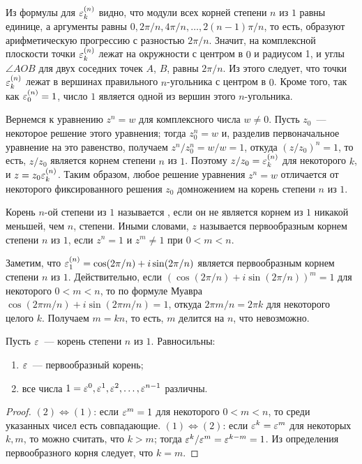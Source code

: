 \begin{remark}\label{rem:roots_of_unity_geometry}
Из формулы для $\varepsilon_k^{(n)}$ видно, что модули всех корней степени
$n$ из $1$ равны единице, а аргументы равны
$0,2\pi/n,4\pi/n,\dots,2(n-1)\pi/n$, то есть, образуют арифметическую
прогрессию с разностью $2\pi/n$. Значит, на комплексной плоскости
точки $\varepsilon_k^{(n)}$ лежат на окружности с центром в $0$ и радиусом 1,
и углы $\angle AOB$ для двух соседних точек $A$, $B$, равны
$2\pi/n$. Из этого следует, что точки $\varepsilon_k^{(n)}$ лежат в вершинах
правильного $n$-угольника с центром в $0$. Кроме того, так как
$\varepsilon_0^{(n)}=1$, число $1$ является одной из вершин этого $n$-угольника.
\end{remark}

\begin{remark}
Вернемся к уравнению $z^n=w$ для комплексного числа $w\neq 0$. Пусть
$z_0$~--- некоторое решение этого уравнения; тогда $z_0^n=w$ и,
разделив первоначальное уравнение на это равенство, получаем
$z^n/z_0^n=w/w=1$, откуда $(z/z_0)^n=1$, то есть, $z/z_0$ является
корнем степени $n$ из $1$. Поэтому $z/z_0=\varepsilon_k^{(n)}$ для некоторого
$k$, и $z=z_0\varepsilon_k^{(n)}$. Таким образом, любое решение уравнения
$z^n=w$ отличается от некоторого фиксированного решения $z_0$
домножением на корень степени $n$ из $1$.
\end{remark}

\begin{definition}
Корень $n$-ой степени из $1$ называется
, если он
не является корнем из $1$ никакой меньшей, чем $n$, степени. Иными
словами, $z$ называется первообразным корнем степени $n$ из $1$, если
$z^n=1$ и $z^m\neq 1$ при $0<m<n$.
\end{definition}

\begin{remark}
Заметим, что $\varepsilon_1^{(n)}=\cos(2\pi/n)+i\sin(2\pi/n)$ является
первообразным корнем степени $n$ из $1$. Действительно, если
$(\cos(2\pi/n)+i\sin(2\pi/n))^m=1$ для некоторого $0<m<n$, то
по формуле Муавра $\cos(2\pi m/n)+i\sin(2\pi m/n)=1$, откуда $2\pi
m/n=2\pi k$ для некоторого целого $k$. Получаем $m=kn$, то есть, $m$
делится на $n$, что невозможно.
\end{remark}

\begin{proposition}
Пусть $\varepsilon$~--- корень степени $n$ из $1$. Равносильны:
\begin{enumerate}
\item $\varepsilon$~--- первообразный корень;
\item все числа $1=\varepsilon^0, \varepsilon^1, \varepsilon^2,\dots,\varepsilon^{n-1}$ различны.
\end{enumerate}
\end{proposition}
\begin{proof}
$(2)\Leftrightarrow (1)$: если $\varepsilon^m=1$ для некоторого $0<m<n$, то
среди указанных чисел есть совпадающие.
$(1)\Leftrightarrow (2)$: если $\varepsilon^k=\varepsilon^m$ для некоторых $k,m$, то
можно считать, что $k>m$; тогда $\varepsilon^k/\varepsilon^m=\varepsilon^{k-m}=1$. Из
определения первообразного корня следует, что $k=m$.
\end{proof}

